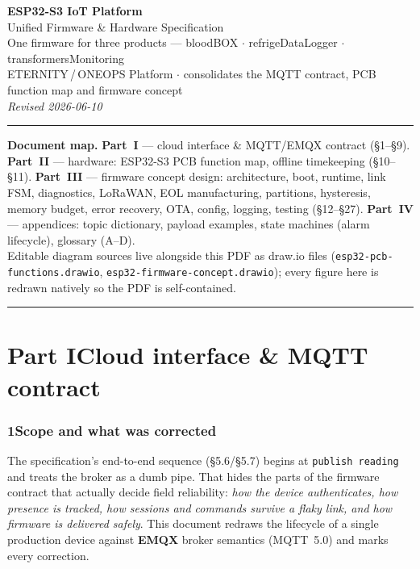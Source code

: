 \documentclass[11pt,a4paper]{article}
\begin{document}
\begin{center}
  {\LARGE\bfseries ESP32-S3 IoT Platform}\\[2pt]
  {\large Unified Firmware \& Hardware Specification}\\[4pt]
  {\normalsize One firmware for three products — bloodBOX \(\cdot\) refrigeDataLogger \(\cdot\) transformersMonitoring}\\[6pt]
  {\small ETERNITY\,/\,ONEOPS Platform \(\cdot\) consolidates the MQTT contract, PCB function map and firmware concept}\\[2pt]
  {\small\itshape Revised 2026-06-10}
\end{center}

\vspace{4pt}\hrule\vspace{6pt}

\noindent\textbf{Document map.}\;
\textbf{Part~I} — cloud interface \& MQTT/EMQX contract (\S1--\S9).\quad
\textbf{Part~II} — hardware: ESP32-S3 PCB function map, offline timekeeping (\S10--\S11).\quad
\textbf{Part~III} — firmware concept design: architecture, boot, runtime, link FSM, diagnostics,
LoRaWAN, EOL manufacturing, partitions, hysteresis, memory budget, error recovery, OTA, config,
logging, testing (\S12--\S27).\quad
\textbf{Part~IV} — appendices: topic dictionary, payload examples, state machines (alarm lifecycle),
glossary (A--D).
\\[2pt]
Editable diagram sources live alongside this PDF as draw.io files
(\texttt{esp32-pcb-functions.drawio}, \texttt{esp32-firmware-concept.drawio}); every figure here
is redrawn natively so the PDF is self-contained.

\vspace{8pt}\hrule\vspace{8pt}

\part*{Part I\quad Cloud interface \& MQTT contract}

\section*{1\quad Scope and what was corrected}
The specification's end-to-end sequence (\S5.6/\S5.7) begins at \texttt{publish reading}
and treats the broker as a dumb pipe. That hides the parts of the firmware contract that
actually decide field reliability: \emph{how the device authenticates, how presence is
tracked, how sessions and commands survive a flaky link, and how firmware is delivered
safely}. This document redraws the lifecycle of a single production device against
\textbf{EMQX} broker semantics (MQTT~5.0) and marks every correction.
\end{document}
